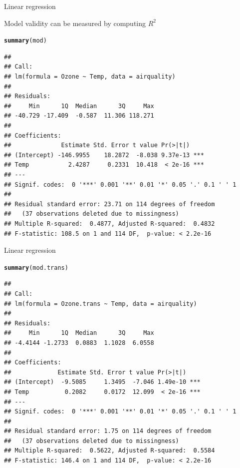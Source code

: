 \documentclass[10pt,xcolor=dvipsnames]{beamer}\usepackage[]{graphicx}\usepackage[]{color}
\makeatletter
\newcommand{\hlstd}[1]{\textcolor[rgb]{0.345,0.345,0.345}{#1}}%
\newcommand{\hlkwd}[1]{\textcolor[rgb]{0.737,0.353,0.396}{\textbf{#1}}}%
\newenvironment{kframe}{%
 \def\at@end@of@kframe{}%
 \ifinner\ifhmode%
  \def\at@end@of@kframe{\end{minipage}}%
  \begin{minipage}{\columnwidth}%
 \fi\fi%
 \def\FrameCommand##1{\hskip\@totalleftmargin \hskip-\fboxsep
 \colorbox{shadecolor}{##1}\hskip-\fboxsep
     \hskip-\linewidth \hskip-\@totalleftmargin \hskip\columnwidth}%
 \MakeFramed {\advance\hsize-\width
   \@totalleftmargin\z@ \linewidth\hsize
   \@setminipage}}%
 {\par\unskip\endMakeFramed%
 \at@end@of@kframe}
\newenvironment{knitrout}{}{} %
\makeatother
\begin{document}
\begin{frame}[fragile]{Linear regression}

Model validity can be measured by computing $R^2$

\scriptsize
\begin{knitrout}
\color{fgcolor}\begin{kframe}
\begin{alltt}
\hlkwd{summary}\hlstd{(mod)}
\end{alltt}
\begin{verbatim}
## 
## Call:
## lm(formula = Ozone ~ Temp, data = airquality)
## 
## Residuals:
##     Min      1Q  Median      3Q     Max 
## -40.729 -17.409  -0.587  11.306 118.271 
## 
## Coefficients:
##              Estimate Std. Error t value Pr(>|t|)    
## (Intercept) -146.9955    18.2872  -8.038 9.37e-13 ***
## Temp           2.4287     0.2331  10.418  < 2e-16 ***
## ---
## Signif. codes:  0 '***' 0.001 '**' 0.01 '*' 0.05 '.' 0.1 ' ' 1
## 
## Residual standard error: 23.71 on 114 degrees of freedom
##   (37 observations deleted due to missingness)
## Multiple R-squared:  0.4877,	Adjusted R-squared:  0.4832 
## F-statistic: 108.5 on 1 and 114 DF,  p-value: < 2.2e-16
\end{verbatim}
\end{kframe}
\end{knitrout}
\normalsize
\end{frame}


\begin{frame}[fragile]{Linear regression}
\scriptsize
\begin{knitrout}
\color{fgcolor}\begin{kframe}
\begin{alltt}
\hlkwd{summary}\hlstd{(mod.trans)}
\end{alltt}
\begin{verbatim}
## 
## Call:
## lm(formula = Ozone.trans ~ Temp, data = airquality)
## 
## Residuals:
##     Min      1Q  Median      3Q     Max 
## -4.4144 -1.2733  0.0883  1.1028  6.0558 
## 
## Coefficients:
##             Estimate Std. Error t value Pr(>|t|)    
## (Intercept)  -9.5085     1.3495  -7.046 1.49e-10 ***
## Temp          0.2082     0.0172  12.099  < 2e-16 ***
## ---
## Signif. codes:  0 '***' 0.001 '**' 0.01 '*' 0.05 '.' 0.1 ' ' 1
## 
## Residual standard error: 1.75 on 114 degrees of freedom
##   (37 observations deleted due to missingness)
## Multiple R-squared:  0.5622,	Adjusted R-squared:  0.5584 
## F-statistic: 146.4 on 1 and 114 DF,  p-value: < 2.2e-16
\end{verbatim}
\end{kframe}
\end{knitrout}
\normalsize
\end{frame}
\end{document}
